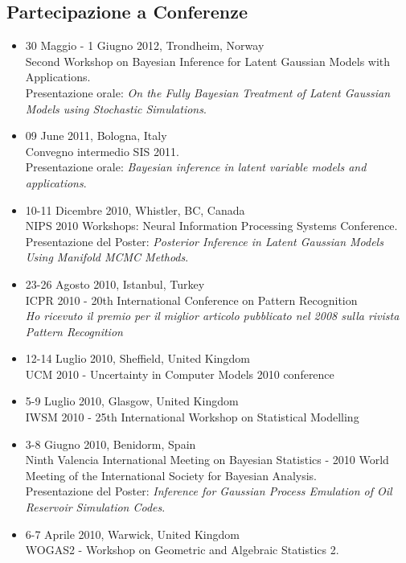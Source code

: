 \documentclass[a4paper,10pt]{article}
\begin{document}
\subsection*{Partecipazione a Conferenze}
\begin{itemize}
\item 30 Maggio - 1 Giugno 2012, Trondheim, Norway \\
  Second Workshop on Bayesian Inference for Latent Gaussian Models with Applications.
  \\Presentazione orale: \emph{On the Fully Bayesian Treatment of Latent Gaussian Models using Stochastic Simulations}.
\item 09 June 2011, Bologna, Italy \\
  Convegno intermedio SIS 2011.
  \\Presentazione orale: \emph{Bayesian inference in latent variable models and applications}.
\item 10-11 Dicembre 2010, Whistler, BC, Canada \\
  NIPS 2010 Workshops: Neural Information Processing Systems Conference.
  \\Presentazione del Poster: \emph{Posterior Inference in Latent Gaussian Models Using Manifold MCMC Methods}.
\item 23-26 Agosto 2010, Istanbul, Turkey \\
  ICPR 2010 - 20th International Conference on Pattern Recognition
  \\\emph{Ho ricevuto il premio per il miglior articolo pubblicato nel 2008 sulla rivista Pattern Recognition}
\item 12-14 Luglio 2010, Sheffield, United Kingdom \\
  UCM 2010 - Uncertainty in Computer Models 2010 conference
\item 5-9 Luglio 2010, Glasgow, United Kingdom \\
  IWSM 2010 - 25th International Workshop on Statistical Modelling
\item 3-8 Giugno 2010, Benidorm, Spain \\
  Ninth Valencia International Meeting on Bayesian Statistics - 2010 World Meeting of the International Society for Bayesian Analysis.
  \\Presentazione del Poster: \emph{Inference for Gaussian Process Emulation of Oil Reservoir Simulation Codes}.
\item 6-7 Aprile 2010, Warwick, United Kingdom \\
  WOGAS2 - Workshop on Geometric and Algebraic Statistics 2.

\end{itemize}
\end{document}
